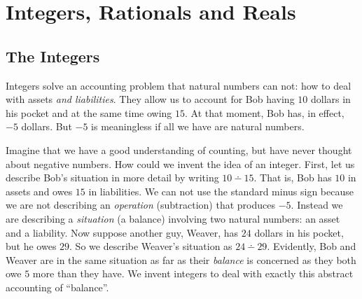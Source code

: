 \documentclass[10pt,oneside,tightlist]{memoir}
\begin{document}
%

%
%

%
%

%

%
%

%


\chapter{Integers, Rationals and Reals}

\section{The Integers}
 
Integers solve an accounting problem that natural numbers can not: how
to deal with assets \emph{and liabilities}.  They allow us to account
for Bob having $10$ dollars in his pocket and at the same time owing
 $15$. At that moment, Bob has, in effect, $-5$ dollars. But $-5$ is
meaningless if all we have are natural numbers. 

Imagine that we have a good understanding of counting, but have never
thought about negative numbers. How could we invent the idea of an
integer.  First, let us describe Bob's situation in more detail by
writing $10\dotminus 15$. That is, Bob has $10$ in assets and owes
$15$ in liabilities. We can not use the standard minus sign because we
are not describing an \emph{operation} (subtraction) that produces
$-5$. Instead we are describing a \emph{situation} (a balance) involving two
natural numbers: an asset and a liability.  Now suppose another guy,
Weaver, has $24$ dollars in his pocket, but he owes $29$.  So we
describe Weaver's situation as $24\dotminus 29$. Evidently, Bob and
Weaver are in the same situation as far as their \emph{balance} is
concerned as they both owe $5$ more than they have. We invent integers 
to deal with exactly this abstract accounting of ``balance''. 
\end{document}
